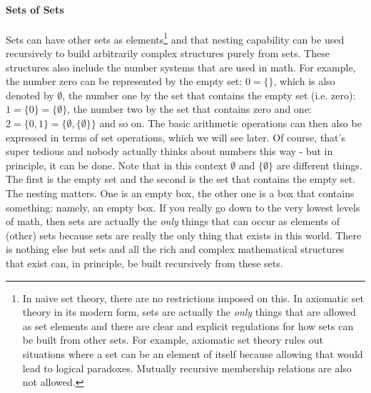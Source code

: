 \paragraph{Sets of Sets}
Sets can have other sets as elements\footnote{In naive set theory, there are no restrictions imposed on this. In axiomatic set theory in its modern form, sets are actually the \emph{only} things that are allowed as set elements and there are clear and explicit regulations for how sets can be built from other sets. For example, axiomatic set theory rules out situations where a set can be an element of itself because allowing that would lead to logical paradoxes. Mutually recursive membership relations are also not allowed.} and that nesting capability can be used recursively to build arbitrarily complex structures purely from sets. These structures also include the number systems that are used in math. For example, the number zero can be represented by the empty set: $0 = \{\}$, which is also denoted by $\emptyset$, the number one by the set that contains the empty set (i.e. zero): $1 = \{ 0 \} =  \{ \emptyset \}$, the number two by the set that contains zero and one: $2 = \{ 0, 1 \} = \{ \emptyset, \{ \emptyset \} \}$ and so on. The basic arithmetic operations can then also be expressed in terms of set operations, which we will see later. Of course, that's super tedious and nobody actually thinks about numbers this way - but in principle, it can be done. Note that in this context $\emptyset$ and $\{ \emptyset \}$ are different things. The first is the empty set and the second is the set that contains the empty set. The nesting matters. One is an empty box, the other one is a box that contains something: namely, an empty box. If you really go down to the very lowest levels of math, then sets are actually the \emph{only} things that can occur as elements of (other) sets because sets are really the only thing that exists in this world. There is nothing else but sets and all the rich and complex mathematical structures that exist can, in principle, be built recursively from these sets. 


